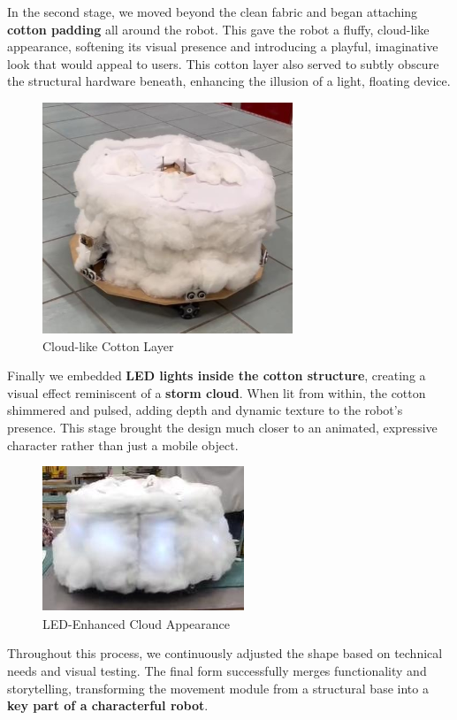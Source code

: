In the second stage, we moved beyond the clean fabric and began attaching \textbf{cotton padding} all around the robot. This gave the robot a fluffy, cloud-like appearance, softening its visual presence and introducing a playful, imaginative look that would appeal to users. This cotton layer also served to subtly obscure the structural hardware beneath, enhancing the illusion of a light, floating device.

\begin{figure}[H]
    \centering
    \includegraphics[width=0.6\linewidth]{../ReportMovementModule/images/Aspose.Words.728084da-df58-4b9d-a372-f65cffbdb23d.027.png}
    \caption{Cloud-like Cotton Layer}
\end{figure}

Finally we embedded \textbf{LED lights inside the cotton structure}, creating a visual effect reminiscent of a \textbf{storm cloud}. When lit from within, the cotton shimmered and pulsed, adding depth and dynamic texture to the robot's presence. This stage brought the design much closer to an animated, expressive character rather than just a mobile object.

\begin{figure}[H]
    \centering
    \includegraphics[width=0.6\linewidth]{../ReportMovementModule/images/Aspose.Words.728084da-df58-4b9d-a372-f65cffbdb23d.028.png}
    \caption{LED-Enhanced Cloud Appearance}
\end{figure}

Throughout this process, we continuously adjusted the shape based on technical needs and visual testing. The final form successfully merges functionality and storytelling, transforming the movement module from a structural base into a \textbf{key part of a characterful robot}.
